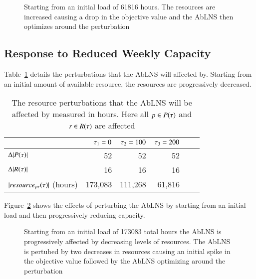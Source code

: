 \begin{figure}[H]%
	\centering
	\resizebox{10cm}{!}{
		
	}
	\caption{Starting from an initial load of 61816 hours. The resources are increased causing a drop in the
		objective value and the AbLNS then optimizes around the perturbation
	}\label{fig:responses:resources-addition}
\end{figure}

\subsection{Response to Reduced Weekly Capacity}\label{sec:results:reduced_weekly_capacity}
Table~\ref{tab:resources:resource-subtraction} details the perturbations that the
AbLNS will affected by. Starting from an initial amount of available
resource, the resources are progressively decreased.
\begin{table}[H]
	\centering
	\begin{tabular}{lrrrrr}
	\toprule
	                                    & $\tau_1 = 0$ & $\tau_2 = 100$ & $\tau_3 = 200$ \\ \midrule
	$\Delta |P(\tau)|$               & 52                     & 52                     & 52                   \\ \midrule
	$\Delta |R(\tau)|$             & 16                     & 16                     & 16                   \\ \midrule
	$ |resource_{pr}(\tau)|$ (hours)& 173,083                 & 111,268                 & 61,816                \\ \bottomrule
	\end{tabular}
	\caption{The resource perturbations that the AbLNS will be affected by measured in hours.
		Here all $p \in P(\tau)$ and $r \in R(\tau)$ are 
		affected}\label{tab:resources:resource-subtraction}
\end{table}

Figure~\ref{fig:responses:resource-subtraction} shows the effects of perturbing
the AbLNS by starting from an initial load and then progressively reducing
capacity.

\begin{figure}[H]%
	\centering
	\resizebox{10cm}{!}{
		
	}
	\caption{Starting from an initial load of 173083 total hours the AbLNS is 
		progressively affected by decreasing levels of resources. The AbLNS is pertubed by two decreases
		in resources causing an initial spike in the objective value followed 
		by the AbLNS optimizing around the perturbation
	}\label{fig:responses:resource-subtraction}
\end{figure}

